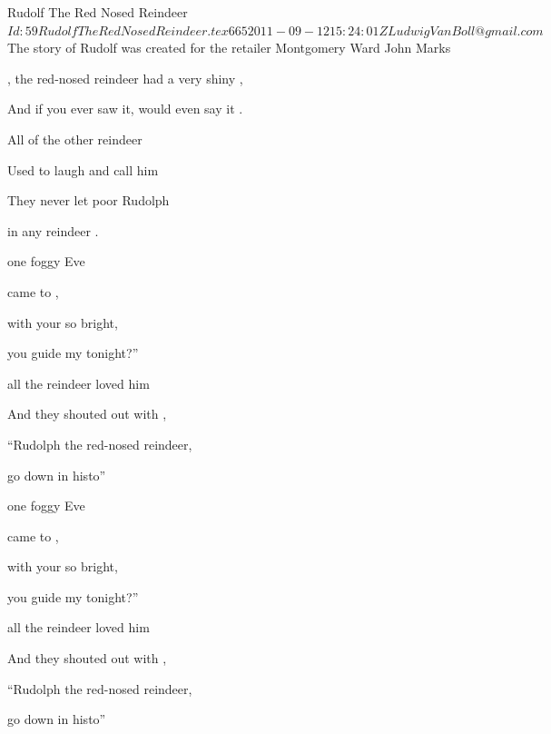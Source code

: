 \begin{SBSong}{Rudolf The Red Nosed Reindeer}
    {$Id: 59RudolfTheRedNosedReindeer.tex 665 2011-09-12 15:24:01Z LudwigVanBoll@gmail.com $}
    {The story of Rudolf was created for the retailer Montgomery Ward}
    {John Marks}
  \begin{SBVerse}
	, the red-nosed reindeer had a very shiny , 

    And if you ever saw it,  would even say it .
	
	All of the other reindeer
	
	Used to laugh and call him 
	
	They never let poor Rudolph
	
	 in any reindeer . 
  \end{SBVerse}
  \begin{SBVerse}
	 one foggy  Eve
	
	 came to , 

     with your  so bright,
	
	 you guide my  tonight?''
	
	 all the reindeer loved him
	
	And they shouted out with ,
	
	``Rudolph the red-nosed reindeer,
	
	 go down in histo'' 
  \end{SBVerse}
  \ifChordBk
    \begin{SBVerse}
       one foggy  Eve
	
	   came to , 

       with your  so bright,
	
	   you guide my  tonight?''
	
	   all the reindeer loved him
	
	  And they shouted out with ,
	
	  ``Rudolph the red-nosed reindeer,
	
	   go down in histo''
    \end{SBVerse}
  \fi
\end{SBSong}


